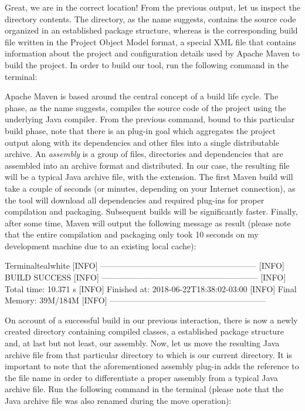 Great, we are in the correct location! From the previous output, let us inspect the directory contents. The  directory, as the name suggests, contains the source code organized in an established package structure, whereas  is the corresponding build file written in the Project Object Model format, a special XML file that contains information about the project and configuration details used by Apache Maven to build the project. In order to build our tool, run the following command in the terminal:


Apache Maven is based around the central concept of a build life cycle. The  phase, as the name suggests, compiles the source code of the project using the underlying Java compiler. From the previous command, bound to this particular build phase, note that there is an  plug-in goal which aggregates the project output along with its dependencies and other files into a single distributable archive. An \emph{assembly} is a group of files, directories and dependencies that are assembled into an archive format and distributed. In our case, the resulting file will be a typical Java archive file, with the  extension. The first Maven build will take a couple of seconds (or minutes, depending on your Internet connection), as the tool will download all dependencies and required plug-ins for proper compilation and packaging. Subsequent builds will be significantly faster. Finally, after some time, Maven will output the following message as result (please note that the entire compilation and packaging only took 10 seconds on my development machine due to an existing local cache):

\begin{codebox}{Terminal}{teal}{\icnote}{white}
[INFO] ---------------------------------------------------------
[INFO] BUILD SUCCESS
[INFO] ---------------------------------------------------------
[INFO] Total time: 10.371 s
[INFO] Finished at: 2018-06-22T18:38:02-03:00
[INFO] Final Memory: 39M/184M
[INFO] ---------------------------------------------------------
\end{codebox}

On account of a successful build in our previous interaction, there is now a newly created  directory containing compiled classes, a established package structure and, at last but not least, our assembly. Now, let us move the resulting Java archive file from that particular directory to  which is our current directory. It is important to note that the aforementioned assembly plug-in adds the  reference to the file name in order to differentiate a proper assembly from a typical Java archive file. Run the following command in the terminal (please note that the Java archive file was also renamed during the move operation):

